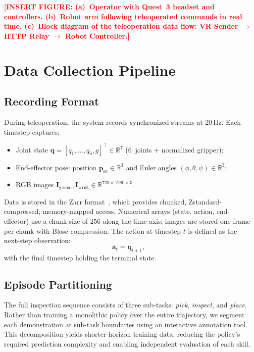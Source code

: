 \documentclass[conference]{IEEEtran}
\newcommand{\placeholder}[1]{\textcolor{red}{\textbf{[#1]}}}
\begin{document}
\placeholder{INSERT FIGURE: (a)~Operator with Quest~3 headset and controllers. (b)~Robot arm following teleoperated commands in real time. (c)~Block diagram of the teleoperation data flow: VR Sender $\to$ HTTP Relay $\to$ Robot Controller.}

\section{Data Collection Pipeline}
\label{sec:data}

\subsection{Recording Format}
During teleoperation, the system records synchronized streams at 20\,Hz. Each timestep captures:
\begin{itemize}
    \item Joint state $\mathbf{q} = [q_1, \ldots, q_6, g]^\top \in \mathbb{R}^7$ (6~joints + normalized gripper);
    \item End-effector pose: position $\mathbf{p}_\mathrm{ee} \in \mathbb{R}^3$ and Euler angles $(\phi, \theta, \psi) \in \mathbb{R}^3$;
    \item RGB images $\mathbf{I}_\mathrm{global}, \mathbf{I}_\mathrm{wrist} \in \mathbb{R}^{720 \times 1280 \times 3}$.
\end{itemize}

Data is stored in the Zarr format~\cite{miles2024zarr}, which provides chunked, Zstandard-compressed, memory-mapped access. Numerical arrays (state, action, end-effector) use a chunk size of 256 along the time axis; images are stored one frame per chunk with Blosc compression. The action at timestep $t$ is defined as the next-step observation:
\begin{equation}
\label{eq:action_def}
\mathbf{a}_t = \mathbf{q}_{t+1},
\end{equation}
with the final timestep holding the terminal state.

\subsection{Episode Partitioning}
The full inspection sequence consists of three sub-tasks: \emph{pick}, \emph{inspect}, and \emph{place}. Rather than training a monolithic policy over the entire trajectory, we segment each demonstration at sub-task boundaries using an interactive annotation tool. This decomposition yields shorter-horizon training data, reducing the policy's required prediction complexity and enabling independent evaluation of each skill.
\end{document}
